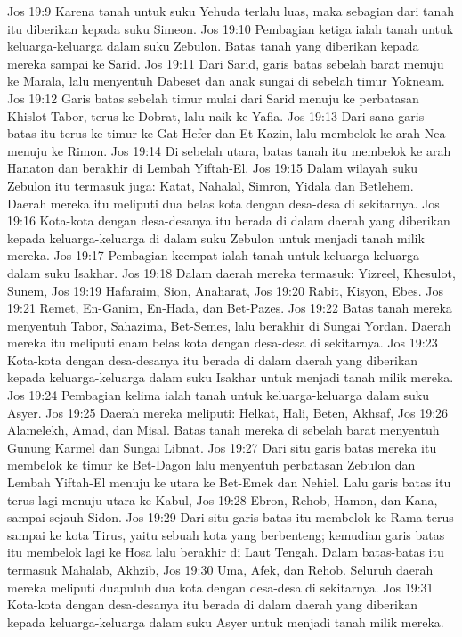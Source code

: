 Jos 19:9  Karena tanah untuk suku Yehuda terlalu luas, maka sebagian dari tanah itu diberikan kepada suku Simeon.
Jos 19:10  Pembagian ketiga ialah tanah untuk keluarga-keluarga dalam suku Zebulon. Batas tanah yang diberikan kepada mereka sampai ke Sarid.
Jos 19:11  Dari Sarid, garis batas sebelah barat menuju ke Marala, lalu menyentuh Dabeset dan anak sungai di sebelah timur Yokneam.
Jos 19:12  Garis batas sebelah timur mulai dari Sarid menuju ke perbatasan Khislot-Tabor, terus ke Dobrat, lalu naik ke Yafia.
Jos 19:13  Dari sana garis batas itu terus ke timur ke Gat-Hefer dan Et-Kazin, lalu membelok ke arah Nea menuju ke Rimon.
Jos 19:14  Di sebelah utara, batas tanah itu membelok ke arah Hanaton dan berakhir di Lembah Yiftah-El.
Jos 19:15  Dalam wilayah suku Zebulon itu termasuk juga: Katat, Nahalal, Simron, Yidala dan Betlehem. Daerah mereka itu meliputi dua belas kota dengan desa-desa di sekitarnya.
Jos 19:16  Kota-kota dengan desa-desanya itu berada di dalam daerah yang diberikan kepada keluarga-keluarga di dalam suku Zebulon untuk menjadi tanah milik mereka.
Jos 19:17  Pembagian keempat ialah tanah untuk keluarga-keluarga dalam suku Isakhar.
Jos 19:18  Dalam daerah mereka termasuk: Yizreel, Khesulot, Sunem,
Jos 19:19  Hafaraim, Sion, Anaharat,
Jos 19:20  Rabit, Kisyon, Ebes.
Jos 19:21  Remet, En-Ganim, En-Hada, dan Bet-Pazes.
Jos 19:22  Batas tanah mereka menyentuh Tabor, Sahazima, Bet-Semes, lalu berakhir di Sungai Yordan. Daerah mereka itu meliputi enam belas kota dengan desa-desa di sekitarnya.
Jos 19:23  Kota-kota dengan desa-desanya itu berada di dalam daerah yang diberikan kepada keluarga-keluarga dalam suku Isakhar untuk menjadi tanah milik mereka.
Jos 19:24  Pembagian kelima ialah tanah untuk keluarga-keluarga dalam suku Asyer.
Jos 19:25  Daerah mereka meliputi: Helkat, Hali, Beten, Akhsaf,
Jos 19:26  Alamelekh, Amad, dan Misal. Batas tanah mereka di sebelah barat menyentuh Gunung Karmel dan Sungai Libnat.
Jos 19:27  Dari situ garis batas mereka itu membelok ke timur ke Bet-Dagon lalu menyentuh perbatasan Zebulon dan Lembah Yiftah-El menuju ke utara ke Bet-Emek dan Nehiel. Lalu garis batas itu terus lagi menuju utara ke Kabul,
Jos 19:28  Ebron, Rehob, Hamon, dan Kana, sampai sejauh Sidon.
Jos 19:29  Dari situ garis batas itu membelok ke Rama terus sampai ke kota Tirus, yaitu sebuah kota yang berbenteng; kemudian garis batas itu membelok lagi ke Hosa lalu berakhir di Laut Tengah. Dalam batas-batas itu termasuk Mahalab, Akhzib,
Jos 19:30  Uma, Afek, dan Rehob. Seluruh daerah mereka meliputi duapuluh dua kota dengan desa-desa di sekitarnya.
Jos 19:31  Kota-kota dengan desa-desanya itu berada di dalam daerah yang diberikan kepada keluarga-keluarga dalam suku Asyer untuk menjadi tanah milik mereka.
